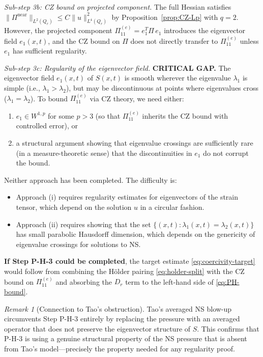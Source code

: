\documentclass[11pt]{article}
\theoremstyle{definition}
\theoremstyle{remark}
\newtheorem{remark}[theorem]{Remark}
\begin{document}
\smallskip
\noindent\emph{Sub-step 3b: CZ bound on projected component.}
The full Hessian satisfies $\|\Pi^{\mathrm{near}}\|_{L^2(Q_r)} \leq C\|u\|_{L^4(Q_r)}^2$
by Proposition~\ref{prop:CZ-Lp} with $q = 2$.  However, the projected component
$\Pi_{11}^{(e)} = e_1^T \Pi\, e_1$ introduces the eigenvector field $e_1(x,t)$,
and the CZ bound on $\Pi$ does not directly transfer to $\Pi_{11}^{(e)}$ unless
$e_1$ has sufficient regularity.

\smallskip
\noindent\emph{Sub-step 3c: Regularity of the eigenvector field.}
\textbf{CRITICAL GAP.}  The eigenvector field $e_1(x,t)$ of $S(x,t)$ is smooth
wherever the eigenvalue $\lambda_1$ is simple (i.e., $\lambda_1 > \lambda_2$), but
may be discontinuous at points where eigenvalues cross ($\lambda_1 = \lambda_2$).
To bound $\Pi_{11}^{(e)}$ via CZ theory, we need either:
\begin{enumerate}[nosep]
  \item[(i)] $e_1 \in W^{1,p}$ for some $p > 3$ (so that $\Pi_{11}^{(e)}$ inherits
    the CZ bound with controlled error), or
  \item[(ii)] a structural argument showing that eigenvalue crossings are
    sufficiently rare (in a measure-theoretic sense) that the discontinuities in
    $e_1$ do not corrupt the bound.
\end{enumerate}

Neither approach has been completed.  The difficulty is:

\begin{itemize}[nosep]
  \item Approach (i) requires regularity estimates for eigenvectors of the strain
    tensor, which depend on the solution $u$ in a circular fashion.
  \item Approach (ii) requires showing that the set
    $\{(x,t) : \lambda_1(x,t) = \lambda_2(x,t)\}$ has small parabolic Hausdorff
    dimension, which depends on the genericity of eigenvalue crossings for
    solutions to NS.
\end{itemize}

\textbf{If Step P-H-3 could be completed}, the target estimate \eqref{eq:coercivity-target}
would follow from combining the H\"older pairing \eqref{eq:holder-split} with the CZ bound
on $\Pi_{11}^{(e)}$ and absorbing the $D_r$ term to the left-hand side of
\eqref{eq:PH-bound}.

\begin{remark}[Connection to Tao's obstruction]
Tao's averaged NS blow-up \cite{Tao} circumvents Step P-H-3 entirely by replacing
the pressure with an averaged operator that does not preserve the eigenvector
structure of $S$.  This confirms that P-H-3 is using a genuine structural property
of the NS pressure that is absent from Tao's model---precisely the property needed
for any regularity proof.
\end{remark}
\end{document}
